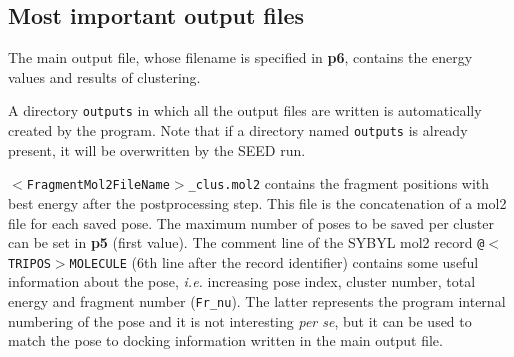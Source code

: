 \documentclass[a4paper,12pt,titlepage]{article}
\begin{document}




\subsection{Most important output files}
\label{ssec:MostOut}

The main output file, whose filename is specified in {\bf p6}, contains the energy 
values and results of clustering.

\noindent
A directory {\tt outputs} in which all the output files are written is 
automatically created by the program. Note that if a directory named \texttt{outputs} is
already present, it will be overwritten by the SEED run.

\noindent
{\tt $<$FragmentMol2FileName$>$\_clus.mol2} contains the fragment positions with 
best energy after the postprocessing step. This file is the concatenation of a mol2 file 
for each saved pose. The maximum number of poses to be saved per cluster can be set in 
\textbf{p5} (first value). The comment line of the SYBYL mol2 record \texttt{@$<$TRIPOS$>$MOLECULE} (6th 
line after the record identifier) contains some useful information about the pose,
\textit{i.e.} increasing pose index, cluster number, total energy and fragment number
(\texttt{Fr\_nu}). The latter represents the program internal numbering of the pose and it is not interesting \textit{per se}, but it can be used to match the pose to docking information written in the main output file.
\end{document}
